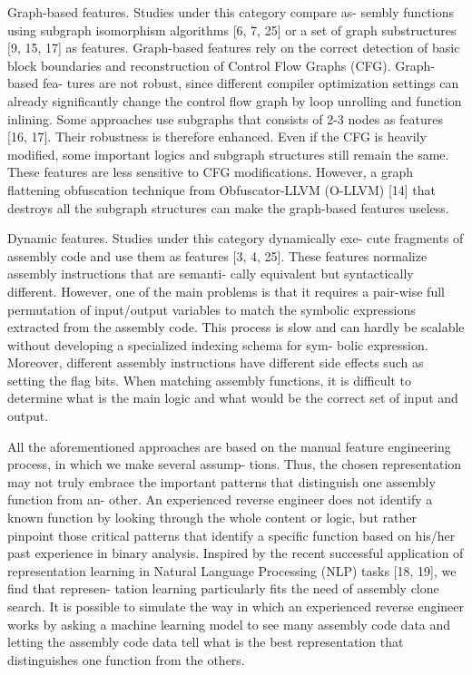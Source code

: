 Graph-based features. Studies under this category compare as-
sembly functions using subgraph isomorphism algorithms [6, 7, 25]
or a set of graph substructures [9, 15, 17] as features. Graph-based
features rely on the correct detection of basic block boundaries
and reconstruction of Control Flow Graphs (CFG). Graph-based fea-
tures are not robust, since different compiler optimization settings
can already significantly change the control flow graph by loop
unrolling and function inlining. Some approaches use subgraphs
that consists of 2-3 nodes as features [16, 17]. Their robustness
is therefore enhanced. Even if the CFG is heavily modified, some
important logics and subgraph structures still remain the same.
These features are less sensitive to CFG modifications. However,
a graph flattening obfuscation technique from Obfuscator-LLVM
(O-LLVM) [14] that destroys all the subgraph structures can make
the graph-based features useless.

Dynamic features. Studies under this category dynamically exe-
cute fragments of assembly code and use them as features [3, 4, 25].
These features normalize assembly instructions that are semanti-
cally equivalent but syntactically different. However, one of the
main problems is that it requires a pair-wise full permutation of
input/output variables to match the symbolic expressions extracted
from the assembly code. This process is slow and can hardly be
scalable without developing a specialized indexing schema for sym-
bolic expression. Moreover, different assembly instructions have
different side effects such as setting the flag bits. When matching
assembly functions, it is difficult to determine what is the main
logic and what would be the correct set of input and output.

All the aforementioned approaches are based on the manual
feature engineering process, in which we make several assump-
tions. Thus, the chosen representation may not truly embrace the
important patterns that distinguish one assembly function from an-
other. An experienced reverse engineer does not identify a known
function by looking through the whole content or logic, but rather
pinpoint those critical patterns that identify a specific function
based on his/her past experience in binary analysis. Inspired by the
recent successful application of representation learning in Natural
Language Processing (NLP) tasks [18, 19], we find that represen-
tation learning particularly fits the need of assembly clone search.
It is possible to simulate the way in which an experienced reverse
engineer works by asking a machine learning model to see many
assembly code data and letting the assembly code data tell what is
the best representation that distinguishes one function from the
others.

